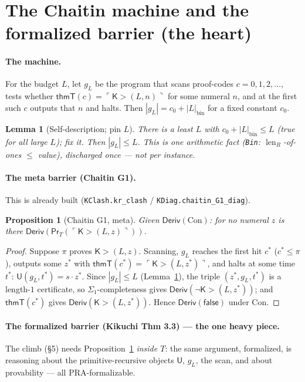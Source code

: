 \documentclass[11pt]{article}
\theoremstyle{plain}
\newtheorem{lemma}[theorem]{Lemma}
\newtheorem{proposition}[theorem]{Proposition}
\theoremstyle{definition}
\theoremstyle{remark}
\newcommand{\code}[1]{\ulcorner #1 \urcorner}
\newcommand{\evalU}{\mathsf{U}}
\newcommand{\Prov}{\mathsf{Pr}}
\newcommand{\Con}{\mathrm{Con}}
\newcommand{\Kgt}{\mathsf{K{>}}}
\newcommand{\false}{\mathsf{false}}
\newcommand{\thmT}{\mathsf{thmT}}
\DeclareMathOperator{\len}{len}
\begin{document}
\section{The Chaitin machine and the formalized barrier (the heart)}

\paragraph{The machine.} For the budget $L$, let $g_L$ be the program that scans
proof-codes $c=0,1,2,\dots$, tests whether $\thmT(c)=\code{\Kgt(L,n)}$ for some
numeral $n$, and at the first such $c$ outputs that $n$ and halts. Then
$|g_L| = c_0 + |L|_{\mathrm{bin}}$ for a fixed constant $c_0$.

\begin{lemma}[Self-description; pin $L$]\label{lem:dlen}
There is a least $L$ with $c_0 + |L|_{\mathrm{bin}} \le L$ (true for all large $L$);
fix it. Then $|g_L|\le L$. This is one arithmetic fact (\texttt{Bin}:
$\len_R$-of-ones $\le$ value), discharged once --- not per instance.
\end{lemma}

\paragraph{The meta barrier (Chaitin G1).} This is already built
(\texttt{KClash.kr\_clash} / \texttt{KDiag.chaitin\_G1\_diag}).

\begin{proposition}[Chaitin G1, meta]\label{prop:g1}
Given $\mathsf{Deriv}(\Con)$: for no numeral $z$ is there $\mathsf{Deriv}(\Prov_T(\code{\Kgt(L,z)}))$.
\end{proposition}
\begin{proof}
Suppose $\pi$ proves $\Kgt(L,z)$. Scanning, $g_L$ reaches the first hit $c^\ast$
($c^\ast\le\pi$), outputs some $z^\ast$ with $\thmT(c^\ast)=\code{\Kgt(L,z^\ast)}$,
and halts at some time $t^\ast$: $\evalU(g_L,t^\ast)=s\cdot z^\ast$. Since
$|g_L|\le L$ (Lemma~\ref{lem:dlen}), the triple $(z^\ast,g_L,t^\ast)$ is a length-$1$
certificate, so $\Sigma_1$-completeness gives $\mathsf{Deriv}(\neg\Kgt(L,z^\ast))$;
and $\thmT(c^\ast)$ gives $\mathsf{Deriv}(\Kgt(L,z^\ast))$. Hence
$\mathsf{Deriv}(\false)$ under $\Con$.
\end{proof}

\paragraph{The formalized barrier (Kikuchi Thm 3.3) --- the one heavy piece.}
The climb (\S5) needs Proposition~\ref{prop:g1} \emph{inside $T$}: the same argument,
formalized, is reasoning about the primitive-recursive objects $\evalU$, $g_L$, the
scan, and about provability --- all PRA-formalizable.
\end{document}

